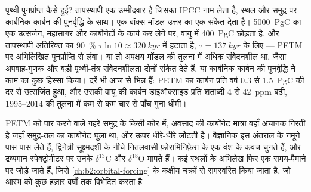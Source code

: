 \begin{omfigure}
\centering
{}
\par{}
\end{omfigure}

पृथ्वी पुनर्प्राप्त कैसे हुई? तापस्थापी एक उम्मीदवार है जिसका IPCC नाम लेता है, स्थल और समुद्र पर
कार्बनिक कार्बन की पुनर्वृद्धि के साथ। एक-बॉक्स मॉडल उत्तर का एक संकेत देता है।
\qty{5000}{PgC} का एक उत्सर्जन, महासागर और कार्बोनेटों के कार्य कर लेने पर, वायु में \qty{400}{PgC} छोड़ता है, और
तापस्थापी अतिरिक्त का \qty{90}{\percent} $\tau\ln 10 \approx \qty{320}{kyr}$ में हटाता है,
$\tau = \qty{137}{kyr}$ के लिए --- PETM पर अभिलिखित पुनर्प्राप्ति से लंबा। या तो अपक्षय
मॉडल की तुलना में अधिक संवेदनशील था, जैसा अपवाह-गुणक और बड़ी पृथ्वी-तंत्र संवेदनशीलता
दोनों संकेत देते हैं, या कार्बनिक कार्बन की पुनर्वृद्धि ने काम का कुछ हिस्सा किया। दरें भी आज से
भिन्न हैं: PETM का कार्बन प्रति वर्ष 0.3 से \qty{1.5}{PgC} की दर से उत्सर्जित हुआ, और उसकी वायु की कार्बन
डाइऑक्साइड प्रति शताब्दी 4 से \qty{42}{ppm} बढ़ी, 1995--2014 की तुलना में कम से कम चार से पाँच गुना धीमी।

\begin{inthelab}[किसी कोर में एक अतिऊष्मीय घटना पढ़ना]
PETM को पार करने वाले गहरे समुद्र के किसी कोर में, अवसाद की कार्बोनेट मात्रा वहाँ अचानक गिरती है
जहाँ समुद्र-तल का कार्बोनेट घुला था, और ऊपर धीरे-धीरे लौटती है। वैज्ञानिक इस अंतराल के नमूने
पास-पास लेते हैं, द्विनेत्री सूक्ष्मदर्शी के नीचे नितलवासी फ़ोरामिनिफ़ेरा के एक वंश के कवच चुनते हैं,
और द्रव्यमान स्पेक्ट्रोमीटर पर उनके $\delta^{13}$C और $\delta^{18}$O मापते हैं। कई स्थलों के
अभिलेख फिर एक समय-पैमाने पर जोड़े जाते हैं, जिसे \cref{ch:b2:orbital-forcing} के कक्षीय चक्रों से
समस्वरित किया जाता है, जो आरंभ को कुछ हज़ार वर्षों तक विभेदित करता है।
\end{inthelab}

